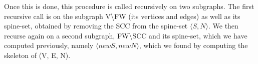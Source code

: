 \documentclass[../master.tex]{subfiles}
\newcommand{\pair}[2]{\ensuremath{\langle #1, #2\rangle}}
\begin{document}
Once this is done, this procedure is called recursively on two subgraphs. The first recursive call is on the subgraph V\textbackslash FW (its vertices and edges) as well as its spine-set, obtained by removing the SCC from the spine-set \pair{S}{N}. We then recurse again on a second subgraph, FW\textbackslash SCC and its spine-set, which we have computed previously, namely \pair{newS}{newN}, which we found by computing the skeleton of (V, E, N).

\end{document}
